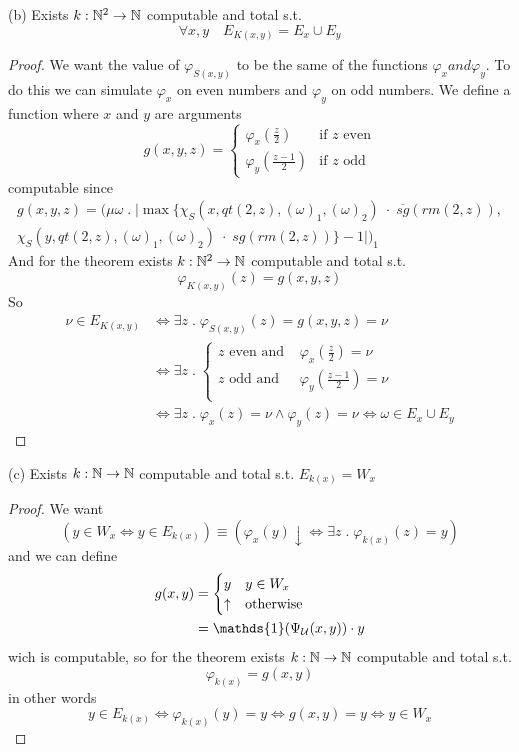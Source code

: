 (b) Exists $k:\mathbb{N}^2 \rightarrow \mathbb{N}$ computable and total s.t.
\[\forall x,y \quad E_{K(x,y)} = E_x \cup E_y\]
\begin{proof}
  We want the value of $\varphi_{S(x,y)}$ to be the same of the
  functions $\varphi_x and \varphi_y$. To do this we can simulate
  $\varphi_x$ on even numbers and $\varphi_y$ on odd numbers. We
  define a function where $x$ and $y$ are arguments
  \[
    g(x,y,z) = \begin{cases}
      \varphi_x(\frac{z}{2}) & \mbox{if } z \mbox{ even} \\
      \varphi_y(\frac{z-1}{2}) & \mbox{if } z \mbox{ odd}
    \end{cases}
  \]
  computable since
  \begin{multline*}
    g(x,y,z) = (\mu \omega \; . \; |\max\{\chi_S(x,qt(2,z),(\omega)_1,(\omega)_2) \; \cdot \; \overline{sg}(rm(2,z)), \\ \chi_S(y,qt(2,z),(\omega)_1, (\omega)_2) \; \cdot \; sg(rm(2,z))\}- 1|)_1
  \end{multline*}
  And for the \smn theorem exists $k: \mathbb{N}^2 \rightarrow \mathbb{N}$
  computable and total s.t. \[\varphi_{K(x,y)}(z) = g(x,y,z)\]
  So
  \[
    \begin{split}
      \nu \in E_{K(x,y)} & \Leftrightarrow \exists z \; . \; \varphi_{S(x,y)}(z) = g(x,y,z) = \nu \\
      & \Leftrightarrow \exists z \; . \; \begin{cases}
        z \mbox{ even and } & \varphi_x(\frac{z}{2}) = \nu \\
        z \mbox{ odd and } & \varphi_y(\frac{z-1}{2}) = \nu \\
      \end{cases} \\
      & \Leftrightarrow \exists z \; . \; \varphi_x(z) = \nu \wedge
      \varphi_y(z) = \nu \Leftrightarrow \omega \in E_x \cup E_y
    \end{split}
  \]
\end{proof}

(c) Exists $k : \mathbb{N} \rightarrow \mathbb{N}$ computable and total s.t. $E_{k(x)} = W_x$
\begin{proof}
  We want
  \[(y \in W_x \Leftrightarrow y \in E_{k(x)}) \equiv
    (\varphi_x(y)\downarrow \Leftrightarrow \exists z \; . \;
    \varphi_{k(x)}(z) = y) \]
  and we can define
  \[
    \begin{split}
      g(x,y) &= \begin{cases}
        y & y \in W_x \\
        \uparrow & \mbox{otherwise}
      \end{cases} \\
      &= \mathds{1}( \univ (x,y)) \cdot y
    \end{split}
  \]
  wich is computable, so for the \smn theorem exists $k : \mathbb{N} \rightarrow \mathbb{N}$
  computable and total s.t. \[\varphi_{k(x)} = g(x,y)\]
  in other words
  \[y \in E_{k(x)} \Leftrightarrow \varphi_{k(x)}(y) = y
    \Leftrightarrow g(x,y) = y  \Leftrightarrow y \in W_x\]
\end{proof}

